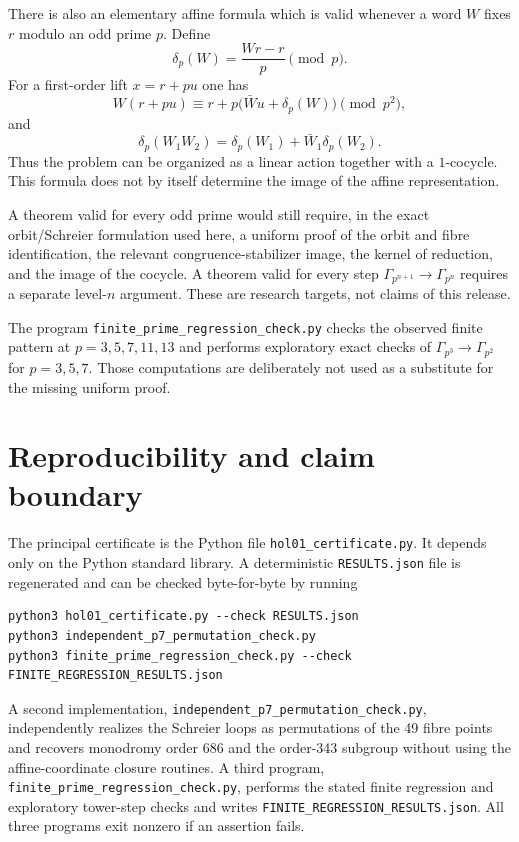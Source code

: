 \documentclass[11pt]{article}
\begin{document}
There is also an elementary affine formula which is valid whenever a word $W$ fixes $r$ modulo an odd prime $p$. Define
\[
\delta_p(W)=\frac{Wr-r}{p}\pmod p.
\]
For a first-order lift $x=r+pu$ one has
\[
W(r+pu)\equiv r+p\bigl(\bar W u+\delta_p(W)\bigr)\pmod{p^2},
\]
and
\[
\delta_p(W_1W_2)=\delta_p(W_1)+\bar W_1\delta_p(W_2).
\]
Thus the problem can be organized as a linear action together with a $1$-cocycle. This formula does not by itself determine the image of the affine representation.

A theorem valid for every odd prime would still require, in the exact orbit/Schreier formulation used here, a uniform proof of the orbit and fibre identification, the relevant congruence-stabilizer image, the kernel of reduction, and the image of the cocycle. A theorem valid for every step $\Gamma_{p^{n+1}}\to\Gamma_{p^n}$ requires a separate level-$n$ argument. These are research targets, not claims of this release.

The program \texttt{finite\_prime\_regression\_check.py} checks the observed finite pattern at $p=3,5,7,11,13$ and performs exploratory exact checks of $\Gamma_{p^3}\to\Gamma_{p^2}$ for $p=3,5,7$. Those computations are deliberately not used as a substitute for the missing uniform proof.

\section{Reproducibility and claim boundary}
The principal certificate is the Python file \texttt{hol01\_certificate.py}.  It depends only on the Python standard library.  A deterministic \texttt{RESULTS.json} file is regenerated and can be checked byte-for-byte by running
\begin{verbatim}
python3 hol01_certificate.py --check RESULTS.json
python3 independent_p7_permutation_check.py
python3 finite_prime_regression_check.py --check FINITE_REGRESSION_RESULTS.json
\end{verbatim}
A second implementation, \texttt{independent\_p7\_permutation\_check.py}, independently realizes the Schreier loops as permutations of the 49 fibre points and recovers monodromy order 686 and the order-343 subgroup without using the affine-coordinate closure routines.  A third program, \texttt{finite\_prime\_regression\_check.py}, performs the stated finite regression and exploratory tower-step checks and writes \texttt{FINITE\_REGRESSION\_RESULTS.json}.  All three programs exit nonzero if an assertion fails.
\end{document}
